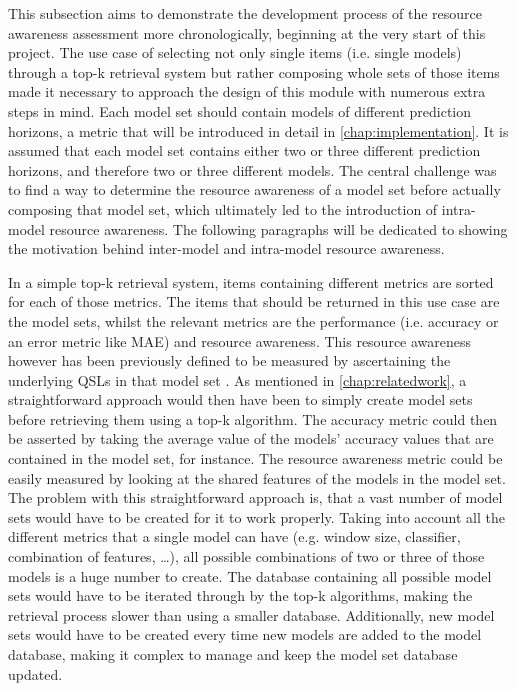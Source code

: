 This subsection aims to demonstrate the development process of the resource awareness assessment more chronologically, beginning at the very start of this project. The use case of selecting not only single items (i.e. single models) through a top-k retrieval system but rather composing whole sets of those items made it necessary to approach the design of this module with numerous extra steps in mind. Each model set should contain models of different prediction horizons, a metric that will be introduced in detail in \autoref{chap:implementation}. It is assumed that each model set contains either two or three different prediction horizons, and therefore two or three different models. The central challenge was to find a way to determine the resource awareness of a model set before actually composing that model set, which ultimately led to the introduction of intra-model resource awareness. The following paragraphs will be dedicated to showing the motivation behind inter-model and intra-model resource awareness. 

In a simple top-k retrieval system, items containing different metrics are sorted for each of those metrics. The items that should be returned in this use case are the model sets, whilst the relevant metrics are the performance (i.e. accuracy or an error metric like MAE) and resource awareness. This resource awareness however has been previously defined to be measured by ascertaining the underlying QSLs in that model set \cite{sunkel2022}. As mentioned in \autoref{chap:relatedwork}, a straightforward approach would then have been to simply create model sets before retrieving them using a top-k algorithm. The accuracy metric could then be asserted by taking the average value of the models' accuracy values that are contained in the model set, for instance. The resource awareness metric could be easily measured by looking at the shared features of the models in the model set. The problem with this straightforward approach is, that a vast number of model sets would have to be created for it to work properly. Taking into account all the different metrics that a single model can have (e.g. window size, classifier, combination of features, …), all possible combinations of two or three of those models is a huge number to create. The database containing all possible model sets would have to be iterated through by the top-k algorithms, making the retrieval process slower than using a smaller database. Additionally, new model sets would have to be created every time new models are added to the model database, making it complex to manage and keep the model set database updated. 

